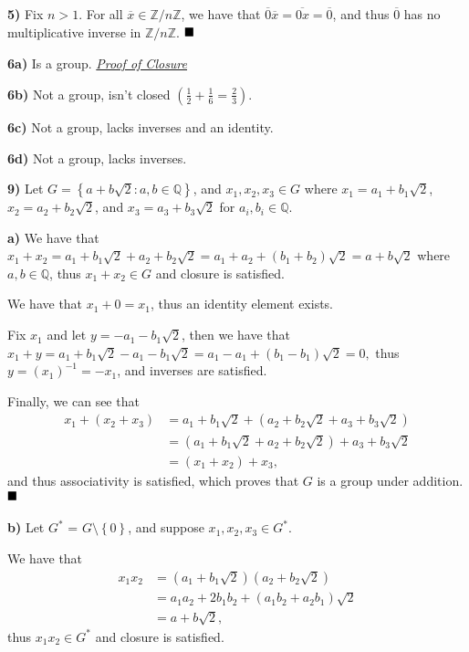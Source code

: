 \documentclass[12pt]{article}
\newcommand{\Z}{\mathbb{Z}}
\newcommand{\Q}{\mathbb{Q}}
\newcommand{\braceb}[1]{\left\{#1\right\}}
\newcommand{\parenb}[1]{\left(#1\right)}
\newcommand{\done}{\ensuremath{\strut\hfill\blacksquare}}
\begin{document}
\textbf{5)}
Fix \( n > 1 \). For all \( \overline{x} \in \Z / n\Z \), we have that
\( \overline{0}\overline{x} = \overline{0x} = \overline{0} \), and thus
\( \overline{0} \) has no multiplicative inverse in \( \Z / n\Z \).
\done

\textbf{6a)}
Is a group. \textit{\hyperref[proof1]{Proof of Closure}}

\textbf{6b)}
Not a group, isn't closed
\( \parenb{\frac{1}{2} + \frac{1}{6} = \frac{2}{3}} \).

\textbf{6c)}
Not a group, lacks inverses and an identity.

\textbf{6d)}
Not a group, lacks inverses.

\textbf{9)}
Let \( G = \braceb{a + b\sqrt{2} : a, b \in \Q} \), and
\( x_1, x_2, x_3 \in G \) where \( x_1 = a_1 + b_1\sqrt{2} \),
\( x_2 = a_2 + b_2\sqrt{2} \), and \( x_3 = a_3 + b_3\sqrt{2} \)
for \( a_i, b_i \in \Q \).

\textbf{a)}
We have that
\(
	x_1 + x_2
	= a_1 + b_1\sqrt{2} + a_2 + b_2\sqrt{2}
	= a_1 + a_2 + (b_1 + b_2)\sqrt{2}
	= a + b\sqrt{2}
\)
where \( a, b \in \Q \), thus \( x_1 + x_2 \in G \) and closure is satisfied.

We have that \( x_1 + 0 = x_1 \), thus an identity element exists.

Fix \( x_1 \) and let \( y = -a_1 - b_1\sqrt{2} \), then we have that
\(
	x_1 + y
	= a_1 + b_1\sqrt{2} - a_1 - b_1\sqrt{2}
	= a_1 - a_1 + (b_1 - b_1)\sqrt{2}
	= 0,
\)
thus \( y = (x_1)^{-1} = -x_1 \), and inverses are satisfied.

Finally, we can see that
\begin{align*}
	x_1 + (x_2 + x_3)
	& = a_1 + b_1\sqrt{2}
	+ \parenb{a_2 + b_2\sqrt{2} + a_3 + b_3\sqrt{2}} \\
	& = \parenb{a_1 + b_1\sqrt{2} + a_2 + b_2\sqrt{2}}
	+ a_3 + b_3\sqrt{2} \\
	& = (x_1 + x_2) + x_3,
\end{align*}
and thus associativity is satisfied, which proves that \( G \) is a group under
addition.
\done

\textbf{b)}
Let \( G^* \) = \( G \setminus \braceb{0} \), and suppose
\( x_1, x_2, x_3 \in G^* \).

We have that
\begin{align*}
	x_1x_2
	& = (a_1 + b_1\sqrt{2})(a_2 + b_2\sqrt{2}) \\
	& = a_1a_2 + 2b_1b_2 + (a_1b_2 + a_2b_1)\sqrt{2} \\
	& = a + b\sqrt{2},
\end{align*}
thus \( x_1x_2 \in G^* \) and closure is satisfied.
\end{document}
